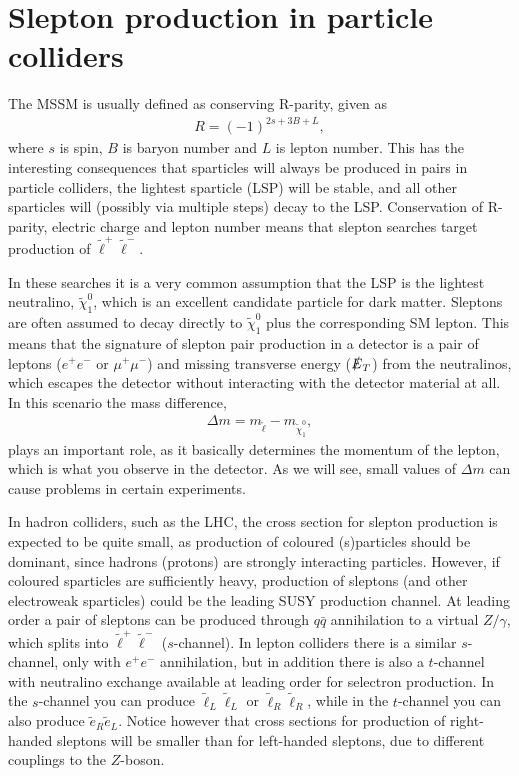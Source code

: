 \documentclass[twocolumn,a4paper,10pt]{article}
\begin{document}
\section{Slepton production in particle colliders}

The MSSM is usually defined as conserving R-parity, given as  
\begin{align*}
R = (-1)^{2s + 3B + L}, 
\end{align*}
where $s$ is spin, $B$ is baryon number and $L$ is lepton number. This has the 
interesting consequences that sparticles will always be produced in pairs in particle colliders, 
the lightest sparticle (LSP) will be stable, and all other sparticles will (possibly via multiple steps) 
decay to the LSP. Conservation of R-parity, electric charge and lepton number means that slepton searches 
target production of $\tilde{\ell}^+\tilde{\ell}^-$. 

In these searches it is a very common assumption that 
the LSP is the lightest neutralino, $\tilde{\chi}_1^0$, which is an excellent candidate particle for 
dark matter. Sleptons are often assumed to decay directly to $\tilde{\chi}_1^0$ plus the corresponding SM
lepton. This means that the signature of slepton pair production in a detector is a pair of leptons  
($e^+e^-$ or $\mu^+\mu^-$) and missing transverse energy ($\slashed{E}_T$) from the neutralinos, 
which escapes the detector without interacting with the detector material at all. In this scenario the 
mass difference, 
\begin{align}
\Delta m = m_{\tilde{\ell}} - m_{\tilde{\chi}^0_1}, 
\label{eq:delta m}
\end{align}  
plays an important role, as it basically determines the momentum of the lepton, which is 
what you observe in the detector. As we will see, small values of $\Delta m$ can cause problems in 
certain experiments. 

In hadron colliders, such as the LHC, the cross section for slepton production is expected to be 
quite small, as production of coloured (s)particles should be dominant, since hadrons (protons) 
are strongly interacting particles. 
However, if coloured sparticles are sufficiently heavy, production of sleptons (and other electroweak 
sparticles) could be the leading SUSY production channel. At leading order a pair of sleptons can be 
produced through $q\bar{q}$ annihilation to a virtual $Z/\gamma$, which splits into 
$\tilde{\ell}^+\tilde{\ell}^-$ ($s$-channel). In lepton colliders there is a similar $s$-channel, only 
with $e^+e^-$ annihilation, but in addition there is also a $t$-channel with neutralino exchange 
available at leading order for selectron production. In the $s$-channel you can produce 
$\tilde{\ell}_L \tilde{\ell}_L$ or $\tilde{\ell}_R \tilde{\ell}_R$, while in the $t$-channel you can 
also produce $\tilde{e}_R\tilde{e}_L$. Notice however that cross sections for production of right-handed 
sleptons will be smaller than for left-handed sleptons, due to different couplings to the $Z$-boson.         
\end{document}
